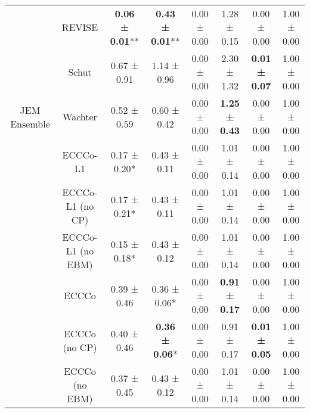 \begin{table}
{\begin{tabular}[t]{cccccccc}
 & REVISE & \textbf{0.06 ± 0.01}** & \textbf{0.43 ± 0.01}** & 0.00 ± 0.00\hphantom{*}\hphantom{*} & 1.28 ± 0.15\hphantom{*}\hphantom{*} & 0.00 ± 0.00\hphantom{*}\hphantom{*} & 1.00 ± 0.00\hphantom{*}\hphantom{*}\\

 & Schut & 0.67 ± 0.91\hphantom{*}\hphantom{*} & 1.14 ± 0.96\hphantom{*}\hphantom{*} & 0.00 ± 0.00\hphantom{*}\hphantom{*} & 2.30 ± 1.32\hphantom{*}\hphantom{*} & \textbf{0.01 ± 0.07}\hphantom{*}\hphantom{*} & 1.00 ± 0.00\hphantom{*}\hphantom{*}\\

\multirow[t]{-9}{*}{\centering\arraybackslash JEM Ensemble} & Wachter & 0.52 ± 0.59\hphantom{*}\hphantom{*} & 0.60 ± 0.42\hphantom{*}\hphantom{*} & 0.00 ± 0.00\hphantom{*}\hphantom{*} & \textbf{1.25 ± 0.43}\hphantom{*}\hphantom{*} & 0.00 ± 0.00\hphantom{*}\hphantom{*} & 1.00 ± 0.00\hphantom{*}\hphantom{*}\\
\cmidrule{1-8}
 & ECCCo-L1 & 0.17 ± 0.20*\hphantom{*} & 0.43 ± 0.11\hphantom{*}\hphantom{*} & 0.00 ± 0.00\hphantom{*}\hphantom{*} & 1.01 ± 0.14\hphantom{*}\hphantom{*} & 0.00 ± 0.00\hphantom{*}\hphantom{*} & 1.00 ± 0.00\hphantom{*}\hphantom{*}\\

 & ECCCo-L1 (no CP) & 0.17 ± 0.21*\hphantom{*} & 0.43 ± 0.11\hphantom{*}\hphantom{*} & 0.00 ± 0.00\hphantom{*}\hphantom{*} & 1.01 ± 0.14\hphantom{*}\hphantom{*} & 0.00 ± 0.00\hphantom{*}\hphantom{*} & 1.00 ± 0.00\hphantom{*}\hphantom{*}\\

 & ECCCo-L1 (no EBM) & 0.15 ± 0.18*\hphantom{*} & 0.43 ± 0.12\hphantom{*}\hphantom{*} & 0.00 ± 0.00\hphantom{*}\hphantom{*} & 1.01 ± 0.14\hphantom{*}\hphantom{*} & 0.00 ± 0.00\hphantom{*}\hphantom{*} & 1.00 ± 0.00\hphantom{*}\hphantom{*}\\

 & ECCCo & 0.39 ± 0.46\hphantom{*}\hphantom{*} & 0.36 ± 0.06*\hphantom{*} & 0.00 ± 0.00\hphantom{*}\hphantom{*} & \textbf{0.91 ± 0.17}\hphantom{*}\hphantom{*} & 0.00 ± 0.00\hphantom{*}\hphantom{*} & 1.00 ± 0.00\hphantom{*}\hphantom{*}\\

 & ECCCo (no CP) & 0.40 ± 0.46\hphantom{*}\hphantom{*} & \textbf{0.36 ± 0.06}*\hphantom{*} & 0.00 ± 0.00\hphantom{*}\hphantom{*} & 0.91 ± 0.17\hphantom{*}\hphantom{*} & \textbf{0.01 ± 0.05}\hphantom{*}\hphantom{*} & 1.00 ± 0.00\hphantom{*}\hphantom{*}\\

 & ECCCo (no EBM) & 0.37 ± 0.45\hphantom{*}\hphantom{*} & 0.43 ± 0.12\hphantom{*}\hphantom{*} & 0.00 ± 0.00\hphantom{*}\hphantom{*} & 1.01 ± 0.14\hphantom{*}\hphantom{*} & 0.00 ± 0.00\hphantom{*}\hphantom{*} & 1.00 ± 0.00\hphantom{*}\hphantom{*}\\


\end{tabular}}
\end{table}
